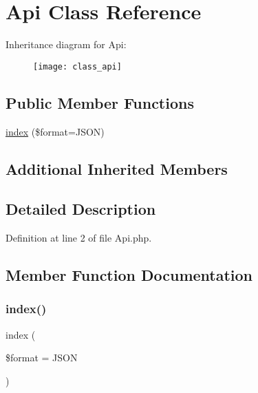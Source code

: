 \hypertarget{class_api}{}\section{Api Class Reference}
\label{class_api}
Inheritance diagram for Api\+:\begin{figure}[H]
\begin{center}
\leavevmode
\texttt{[image: class\_api]}
\end{center}
\end{figure}
\subsection*{Public Member Functions}
\begin{DoxyCompactItemize}
\item 
\hyperlink{class_api_a35a89e327df5738c7786b030eea4fb1a}{index} (\$format=\textquotesingle{}J\+S\+ON\textquotesingle{})
\end{DoxyCompactItemize}
\subsection*{Additional Inherited Members}


\subsection{Detailed Description}


Definition at line 2 of file Api.\+php.



\subsection{Member Function Documentation}
\hypertarget{class_api_a35a89e327df5738c7786b030eea4fb1a}{}\label{class_api_a35a89e327df5738c7786b030eea4fb1a} 
\subsubsection{\texorpdfstring{index()}{index()}}
{\footnotesize\ttfamily index (\begin{DoxyParamCaption}\item[{}]{\$format = {\ttfamily \textquotesingle{}JSON\textquotesingle{}} }\end{DoxyParamCaption})}



